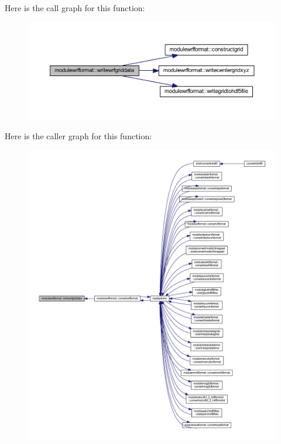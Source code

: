 Here is the call graph for this function\+:\nopagebreak
\begin{figure}[H]
\begin{center}
\leavevmode
\includegraphics[width=350pt]{namespacemodulewrfformat_ac70c0a00b2fe8eb641ec2a6846ed4363_cgraph}
\end{center}
\end{figure}
Here is the caller graph for this function\+:\nopagebreak
\begin{figure}[H]
\begin{center}
\leavevmode
\includegraphics[width=350pt]{namespacemodulewrfformat_ac70c0a00b2fe8eb641ec2a6846ed4363_icgraph}
\end{center}
\end{figure}



